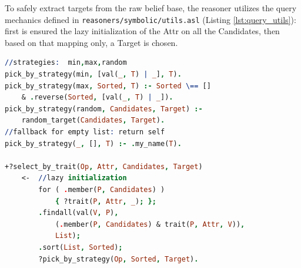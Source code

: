 To safely extract targets from the raw belief base, the reasoner utilizes the query mechanics defined in \texttt{reasoners/symbolic/utils.asl} (Listing \ref{lst:query_utils}): first is ensured the lazy initialization of the Attr on all the Candidates, then based on that mapping only, a Target is chosen.

\begin{lstlisting}[frame=single, language=Prolog, caption={Implementation of the querying utilities. The wrapper enforces lazy initialization before safely aggregating and extracting the optimal candidate.}, label={lst:query_utils}]
//strategies:  min,max,random
pick_by_strategy(min, [val(_, T) | _], T).
pick_by_strategy(max, Sorted, T) :- Sorted \== [] 
    & .reverse(Sorted, [val(_, T) | _]).
pick_by_strategy(random, Candidates, Target) :- 
    random_target(Candidates, Target).
//fallback for empty list: return self 
pick_by_strategy(_, [], T) :- .my_name(T).

+?select_by_trait(Op, Attr, Candidates, Target)
    <-  //lazy initialization
        for ( .member(P, Candidates) ) 
            { ?trait(P, Attr, _); };        
        .findall(val(V, P), 
            (.member(P, Candidates) & trait(P, Attr, V)),
            List);
        .sort(List, Sorted);
        ?pick_by_strategy(Op, Sorted, Target).
\end{lstlisting}

